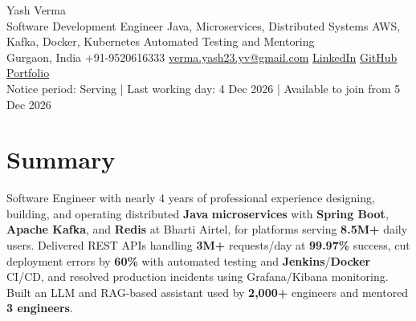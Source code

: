 \documentclass[letterpaper,10pt]{article}
\begin{document}
\begin{center}
  {\Huge Yash Verma} \\
  \small Software Development Engineer \textbar{} Java, Microservices, Distributed Systems \textbar{} AWS, Kafka, Docker, Kubernetes \textbar{} Automated Testing and Mentoring \\
  \small Gurgaon, India \textbar{} +91-9520616333 \textbar{} \href{mailto:verma.yash23.yv@gmail.com}{verma.yash23.yv@gmail.com} \textbar{}
  \href{https://www.linkedin.com/in/yash-verma-9243a7193/}{LinkedIn} \textbar{}
  \href{https://github.com/yashverma230600}{GitHub} \textbar{}
  \href{https://yashverma230600.github.io/yash-portfolio/}{Portfolio} \\
  Notice period: Serving | Last working day: 4 Dec 2026 | Available to join from 5 Dec 2026
  \vspace{-8pt}
\end{center}

\section{Summary}
\begin{itemize}[leftmargin=0.15in, label={}]
  \small{\item{
    Software Engineer with nearly 4 years of professional experience designing, building, and operating distributed \textbf{Java} \textbf{microservices} with \textbf{Spring Boot}, \textbf{Apache Kafka}, and \textbf{Redis} at Bharti Airtel, for platforms serving \textbf{8.5M+} daily users. Delivered REST APIs handling \textbf{3M+} requests/day at \textbf{99.97\%} success, cut deployment errors by \textbf{60\%} with automated testing and \textbf{Jenkins}/\textbf{Docker} CI/CD, and resolved production incidents using Grafana/Kibana monitoring. Built an LLM and RAG-based assistant used by \textbf{2,000+} engineers and mentored \textbf{3 engineers}.
  }}
\end{itemize}
\vspace{-8pt}

\end{document}
